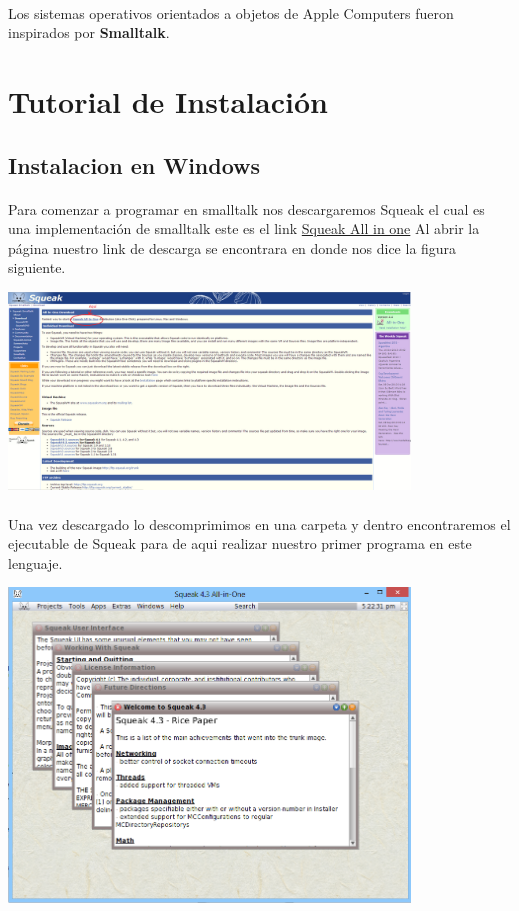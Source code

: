 \documentclass[11pt]{article}
\begin{document}
\paragraph{} \noindent
Los sistemas operativos orientados a objetos de Apple Computers fueron inspirados por \textbf{Smalltalk}.
\section{\textbf{Tutorial de Instalación}}
\subsection{\textbf{Instalacion en Windows}}
\paragraph{} \noindent
Para comenzar a programar en smalltalk nos descargaremos Squeak el cual es una implementación de smalltalk este es el link \href{http://www.squeak.org/Download/}{Squeak All in one}
Al abrir la página nuestro link de descarga se encontrara en donde nos dice la figura siguiente.

				\begin{center}
				\includegraphics[width=0.8\textwidth]{images/tutorial}
				\end{center}
\paragraph{} \noindent
Una vez descargado lo descomprimimos en una carpeta y dentro encontraremos el ejecutable de Squeak para de aqui realizar nuestro primer programa en este lenguaje.

				\begin{center}
				\includegraphics[width=0.8\textwidth]{images/squeak}
				\end{center}
\end{document}
